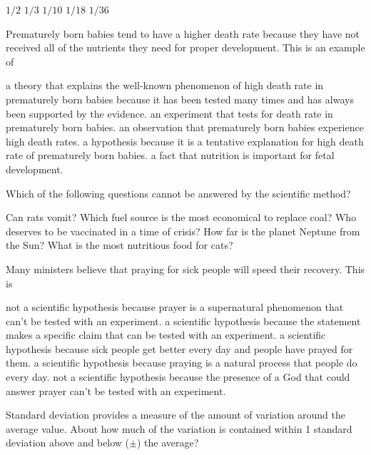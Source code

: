 \begin{choices}
\choice $1/2$
\choice $1/3$
\choice $1/10$
\correctchoice $1/18$
\choice $1/36$
\end{choices}

\question
Prematurely born babies tend to have a higher death rate because they have not received all of the nutrients they need for proper development. This is an example of

\begin{choices}
\choice a theory that explains the well-known phenomenon of high death rate in prematurely born babies because it has been tested many times and has always been supported by the evidence.
\choice an experiment that tests for death rate in prematurely born babies.
\choice an observation that prematurely born babies experience high death rates.
\correctchoice a hypothesis because it is a tentative explanation for high death rate of prematurely born babies.
\choice a fact that nutrition is important for fetal development.
\end{choices}

\newpage

\question
Which of the following questions cannot be answered by the scientific method?

\begin{choices}
\choice Can rats vomit?
\choice Which fuel source is the most economical to replace coal?
\correctchoice Who deserves to be vaccinated in a time of crisis?
\choice How far is the planet Neptune from the Sun?
\choice What is the most nutritious food for cats?
\end{choices}

\question
Many ministers believe that praying for sick people will speed their recovery.  This is

\begin{choices}
\choice not a scientific hypothesis because prayer is a supernatural phenomenon that can't be tested with an experiment.
\correctchoice a scientific hypothesis because the statement makes a specific claim that can be tested with an experiment.
\choice a scientific hypothesis because sick people get better every day and people have prayed for them.
\choice a scientific hypothesis because praying is a natural process that people do every day.
\choice not a scientific hypothesis because the presence of a God that could answer prayer can't be tested with an experiment.
\end{choices}

\question
Standard deviation provides a measure of the amount of variation around the average value. About how much of the variation is contained within 1 standard deviation above and below ($\pm$) the average?

